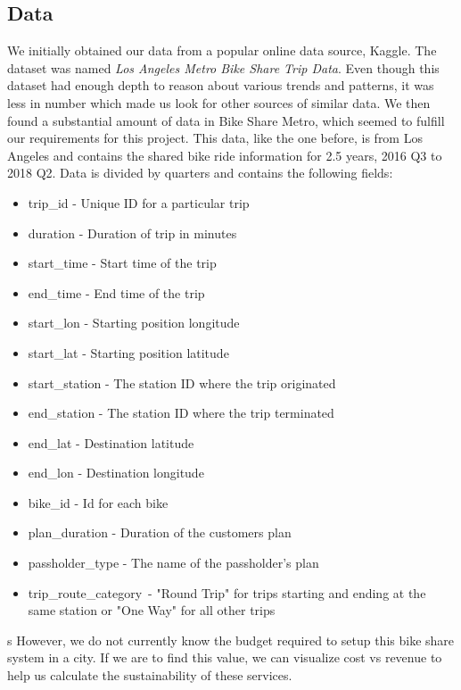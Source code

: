 \subsection{Data}
\label{sec:data}


We initially obtained our data from a popular online data source, Kaggle. The dataset was named \textit{Los Angeles Metro Bike Share Trip Data}. Even though this dataset had enough depth to reason about various trends and patterns, it was less in number which made us look for other sources of similar data. We then found a substantial amount of data in Bike Share Metro, which seemed to fulfill our requirements for this project. This data, like the one before, is from Los Angeles and contains the shared bike ride information for 2.5 years, 2016 Q3 to 2018 Q2. Data is divided by quarters and contains the following fields:
\begin{itemize}
	\item trip\_id - Unique ID for a particular trip
	\item duration - Duration of trip in minutes
	\item start\_time - Start time of the trip
	\item end\_time - End time of the trip
	\item start\_lon - Starting position longitude
	\item start\_lat - Starting position latitude
	\item start\_station - The station ID where the trip originated
	\item end\_station -  The station ID where the trip terminated
	\item end\_lat - Destination latitude
	\item end\_lon - Destination longitude
	\item bike\_id - Id for each bike
	\item plan\_duration - Duration of the customers plan
	\item passholder\_type - The name of the passholder's plan
	\item trip\_route\_category\ -  "Round Trip" for trips starting and ending at the same station or "One Way" for all other trips
\end{itemize}
s
However, we do not currently know the budget required to setup this bike share system in a city. If we are to find this value, we can visualize cost vs revenue to help us calculate the sustainability of these services.
